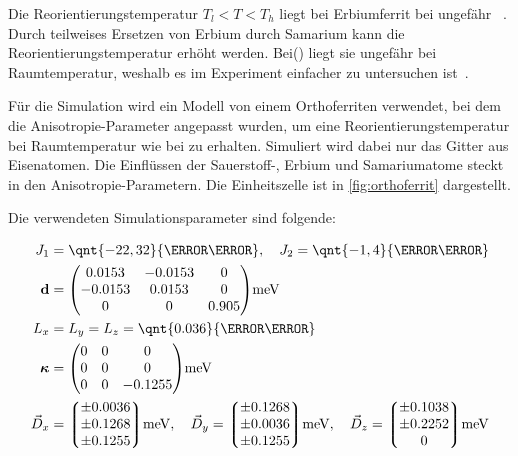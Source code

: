 \documentclass[main.tex]{subfiles}
\begin{document}

Die Reorientierungstemperatur \(T_l < T < T_h\) liegt bei Erbiumferrit bei ungefähr ~\cite{Deng2015}. 
Durch teilweises Ersetzen von Erbium durch Samarium kann die Reorientierungstemperatur erhöht werden. Bei() liegt sie ungefähr bei Raumtemperatur, weshalb es im Experiment einfacher zu untersuchen ist~\cite{Fitzky2021}.


Für die Simulation wird ein Modell von einem Orthoferriten verwendet, bei dem
die Anisotropie-Parameter angepasst wurden, um eine Reorientierungstemperatur
bei Raumtemperatur wie bei  zu erhalten.
Simuliert wird dabei nur das Gitter aus Eisenatomen. Die Einflüssen der
Sauerstoff-, Erbium und Samariumatome steckt in den Anisotropie-Parametern. Die
Einheitszelle ist in \cref{fig:orthoferrit} dargestellt.

Die verwendeten Simulationsparameter sind folgende:

\begin{align}
	J_1           & = \qnt{-22,32}{\milli\electronvolt}, \quad J_2 =
	\qnt{-1,4}{\milli\electronvolt}\label{eq:params-exc}
	\\
	\mat{d}       & = \mqty(
	\num{0.0153}  & \num{-0.0153}                                   & 0
	\\
	\num{-0.0153} & \num{0.0153}                                    & 0
	\\
	0             & 0                                               &
	\num{0.905})\unit{\milli\electronvolt} \label{eq:params-2a}
	\\
	L_x           & = L_y = L_z =
	\qnt{0.036}{\milli\electronvolt}\label{eq:params-4a}
	\\
	\mat{\kappa}  & = \mqty(
	0             & 0                                               & 0
	\\
	0             & 0                                               & 0
	\\
	0             & 0                                               &
	\num{-0.1255})\unit{\milli\electronvolt} \label{eq:params-tia}
	\\
	\vec{D}_x     & = \mqty*(\num{\pm 0.0036}
	\\ \num{\pm 0.1268} \\ \num{\pm
		0.1255})\unit{\milli\electronvolt} , \quad
	\vec{D}_y = \mqty*(\num{\pm 0.1268}
	\\ \num{\pm 0.0036} \\ \num{\pm
		0.1255})\unit{\milli\electronvolt} , \quad
	\vec{D}_z = \mqty*(\num{\pm 0.1038}
	\\ \num{\pm 0.2252} \\ 0)\unit{\milli\electronvolt} \label{eq:params-dmi}
\end{align}
\end{document}
